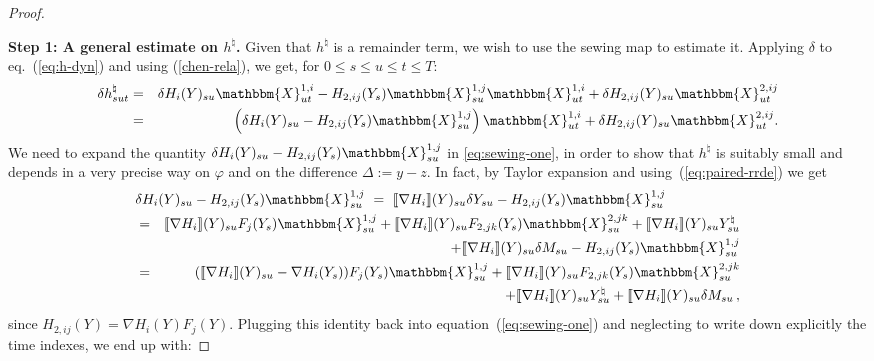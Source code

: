 \documentclass[11pt,reqno,oneside]{amsart}
\numberwithin{equation}{section}
\newcommand{\assign}{:=}
\newcommand{\tmtextbf}[1]{{\bfseries{#1}}}
\newcommand{\lp}{\left(}
\newcommand{\rp}{\right)}
\begin{document}
\begin{proof}
  
	\
  
  {\noindent}\tmtextbf{Step 1: A general estimate on $h^{\natural}$.} Given that $h^{\natural}$ is a remainder term, we wish to use the sewing map to
   estimate it. Applying $\delta$ to
  eq.~(\ref{eq:h-dyn}) and using (\ref{chen-rela}), we get, for $0 \leqslant s \leqslant
    u \leqslant t \leqslant T$:
  \begin{eqnarray}
    \delta h^{\natural}_{s u t} &=& 
     \delta H_i (Y)_{su} \mathbbm{X}^{1,i}_{ut}
    - H_{2,ij}(Y_s) \mathbbm{X}^{1,j}_{s u} \mathbbm{X}^{1,i}_{u t} 
    + \delta H_{2,ij} (Y)_{s u}\mathbbm{X}^{2,ij}_{u t} \notag \\ 
    &=& 
    \lp  \delta H_i (Y)_{su}  - H_{2,ij}(Y_s) \mathbbm{X}^{1,j}_{s u} \rp \mathbbm{X}^{1,i}_{ut}
    + \delta H_{2,ij} (Y)_{s u}\mathbbm{X}^{2,ij}_{u t}\label{eq:sewing-one}  .
			\end{eqnarray}
  We need to expand the quantity $\delta H_i (Y)_{su}  - H_{2,ij}(Y_s) \mathbbm{X}^{1,j}_{s u}$ in \eqref{eq:sewing-one}, in order to show that $h^{\natural}$ is suitably small
  and depends in a very precise way on $\varphi$ and on the difference
  $\Delta \assign y - z$. In fact, by Taylor expansion and using~(\ref{eq:paired-rrde}) we get
  \begin{eqnarray*}
\lefteqn{\delta H_i (Y)_{s u} - H_{2,ij} (Y_s) \mathbbm{X}^{1,j}_{s u}
	\ =\ \llbracket \nabla H_i\rrbracket
    (Y)_{s u} \delta Y_{s u} - H_{2,ij} (Y_s) \mathbbm{X}^{1,j}_{s u}}\\
  & = &\llbracket \nabla H_i\rrbracket (Y)_{s u} F_j (Y_s) \mathbbm{X}^{1,j}_{s u} +
     \llbracket \nabla H_i\rrbracket (Y)_{s u} F_{2,jk} (Y_s) \mathbbm{X}^{2,jk}_{s u} +
     \llbracket \nabla H_i\rrbracket (Y)_{s u} Y^{\natural}_{s u}\\
		& &+ \llbracket
     \nabla H_i\rrbracket (Y)_{s u} \delta M_{s u}- H_{2,ij} (Y_s) \mathbbm{X}^{1,j}_{s u} \\
& = &  (\llbracket \nabla H_i\rrbracket (Y)_{s u} - \nabla H_i (Y_s)) F_j (Y_s)
     \mathbbm{X}^{1,j}_{s u} + \llbracket \nabla H_i \rrbracket (Y)_{s u} F_{2,jk} (Y_s)
     \mathbbm{X}^{2,jk}_{s u}\\
		& &+ \llbracket \nabla H_i \rrbracket(Y)_{s u}
     Y^{\natural}_{s u} + \llbracket \nabla H_i \rrbracket(Y)_{s u} \delta M_{s u} \, ,
	\end{eqnarray*}
  since $H_{2,ij} (Y) = \nabla H_i (Y) F_j (Y)$. Plugging this identity back into equation~(\ref{eq:sewing-one})  and neglecting to write down explicitly the time indexes, we end up with:

\end{proof}
\end{document}

